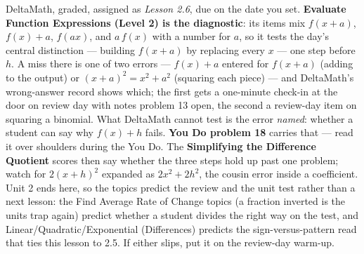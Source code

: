 \documentclass[10pt]{article}
\begin{document}
\begin{teachernote}[Homework]
DeltaMath, graded, assigned as \textit{Lesson 2.6}, due on the date you set. \textbf{Evaluate
Function Expressions (Level 2) is the diagnostic}: its items mix $f(x + a)$, $f(x) + a$,
$f(ax)$, and $a\,f(x)$ with a number for $a$, so it tests the day's central distinction ---
building $f(x + a)$ by replacing every $x$ --- one step before $h$. A miss there is one of two
errors --- $f(x) + a$ entered for $f(x + a)$ (adding to the output) or $(x + a)^2 = x^2 + a^2$
(squaring each piece) --- and DeltaMath's wrong-answer record shows which; the first gets a one-minute check-in at the door on review day with notes
problem 13 open, the second a review-day item on squaring a binomial. What DeltaMath cannot
test is the error \emph{named}: whether a student can say why $f(x) + h$ fails. \textbf{You Do
problem 18} carries that --- read it over shoulders during the You Do. The \textbf{Simplifying the Difference Quotient}
scores then say whether the three steps hold up past one problem; watch for $2(x + h)^2$
expanded as $2x^2 + 2h^2$, the cousin error inside a coefficient. Unit 2 ends here, so the
topics predict the review and the unit test rather than a next lesson: the Find Average Rate of
Change topics (a fraction inverted is the units trap again) predict whether a student divides
the right way on the test, and Linear/Quadratic/Exponential (Differences) predicts the
sign-versus-pattern read that ties this lesson to 2.5. If either slips, put it on the
review-day warm-up.
\end{teachernote}
\end{document}
